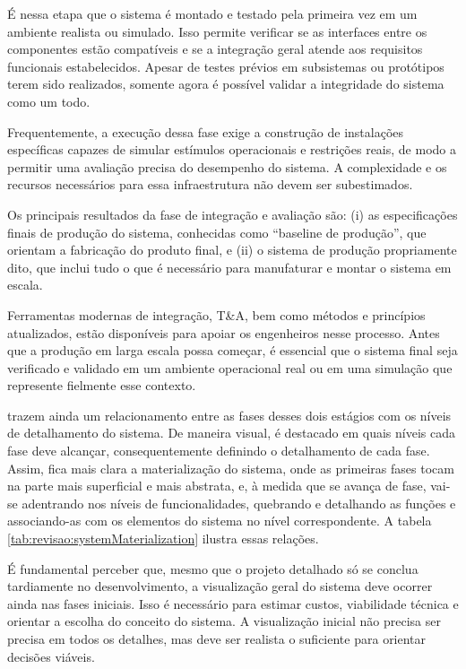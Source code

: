 	É nessa etapa que o sistema é montado e testado pela primeira vez em um ambiente realista ou simulado. Isso permite verificar se as interfaces entre os 
	componentes estão compatíveis e se a integração geral atende aos requisitos funcionais estabelecidos. Apesar de testes prévios em subsistemas ou protótipos 
	terem sido realizados, somente agora é possível validar a integridade do sistema como um todo.

	Frequentemente, a execução dessa fase exige a construção de instalações específicas capazes de simular estímulos operacionais e restrições reais, de modo a 
	permitir uma avaliação precisa do desempenho do sistema. A complexidade e os recursos necessários para essa infraestrutura não devem ser subestimados.

	Os principais resultados da fase de integração e avaliação são: (i) as especificações finais de produção do sistema, conhecidas como ``baseline de produção'', 
	que orientam a fabricação do produto final, e (ii) o sistema de produção propriamente dito, que inclui tudo o que é necessário para manufaturar e montar o 
	sistema em escala.

	Ferramentas modernas de integração, T\&A, bem como métodos e princípios atualizados, estão disponíveis para apoiar os engenheiros nesse processo. Antes que a 
	produção em larga escala possa começar, é essencial que o sistema final seja verificado e validado em um ambiente operacional real ou em uma simulação que represente 
	fielmente esse contexto.

	
	\cite{kossiakoff2020systems} trazem ainda um relacionamento entre as fases desses dois estágios com os níveis de detalhamento do sistema. De maneira visual, é destacado
	em quais níveis cada fase deve alcançar, consequentemente definindo o detalhamento de cada fase. Assim, fica mais clara a materialização do sistema, onde as primeiras fases tocam
	na parte mais superficial e mais abstrata, e, à medida que se avança de fase, vai-se adentrando nos níveis de funcionalidades, quebrando e detalhando as funções e associando-as com
	os elementos do sistema no nível correspondente. A tabela \ref{tab:revisao:systemMaterialization} ilustra essas relações.

	É fundamental perceber que, mesmo que o projeto detalhado só se conclua tardiamente no
	desenvolvimento, a visualização geral do sistema deve ocorrer ainda nas fases iniciais.
	Isso é necessário para estimar custos, viabilidade técnica e orientar a escolha do conceito do sistema.
	A visualização inicial não precisa ser precisa em todos os detalhes, mas deve ser realista o suficiente
	para orientar decisões viáveis.

